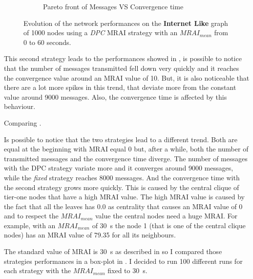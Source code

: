 \begin{figure}[h]
\begin{subfigure}[b]{0.45\textwidth}
		 \caption{Pareto front of Messages VS Convergence time}
         \label{fig:internt_like_1000_DPC_evolution_paretoFront}
     \end{subfigure}
		\caption{Evolution of the network performances on the \textbf{Internet Like} graph 
			of \num{1000} nodes using a \textit{DPC} \ac{MRAI} strategy
			with an $MRAI_{mean}$ from \num{0} to \num{60} seconds.}
        \label{fig:internet_like_1000_dpc_evolution}
\end{figure}

This second strategy leads to the performances showed in ,
is possible to notice that the number of messages transmitted fell down
very quickly and it reaches the convergence value around an \ac{MRAI} value of
\num{10}.
But, it is also noticeable that there are a lot more spikes in this trend, that
deviate more from the constant value around \num{9000} messages.
Also, the convergence time is affected by this behaviour.

Comparing .

Is possible to notice that the two strategies lead to a different trend.
Both are equal at the beginning with \ac{MRAI} equal \num{0} but, after a while,
both the number of transmitted messages and the convergence time diverge.
The number of messages with the \ac{DPC} strategy variate more and it converges
around \num{9000} messages, while the \textit{fixed} strategy reaches \num{8000}
messages.
And the convergence time with the second strategy grows more quickly.
This is caused by the central clique of tier-one nodes that have a high \ac{MRAI}
value.
The high \ac{MRAI} value is caused by the fact that all the leaves has \num{0.0}
as centrality that causes an \ac{MRAI} value of \num{0} and to respect 
the $MRAI_{mean}$ value the central nodes need a huge \ac{MRAI}.
For example, with an $MRAI_{mean}$ of \SI{30}{\second} the node \num{1} (that is
one of the central clique nodes) has an \ac{MRAI} value of \num{79.35} for all its
neighbours.


The standard value of \ac{MRAI} is \SI{30}{\second} as described in
\cite{rfc4271} so I compared those strategies performances in a box-plot in 
.
I decided to run \num{100} different runs for each strategy with the $MRAI_{mean}$
fixed to \SI{30}{\second}.

